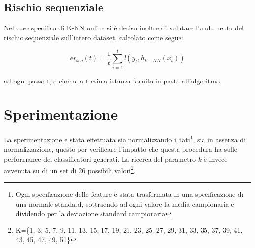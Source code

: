 \documentclass[fleqn,10pt]{SelfArx} %
\begin{document}
\subsection{Rischio sequenziale}
Nel caso specifico di K-NN online si è deciso inoltre di valutare l'andamento del rischio sequenziale sull'intero dataset, calcolato come segue:

\[
er_{seq}(t)=\frac{1}{t}\sum_{i=1}^{t} l(y_t,h_{k-NN}(x_t))
\]

ad ogni passo t, e cioè alla t-esima istanza fornita in pasto all'algoritmo.
\section{Sperimentazione}
La sperimentazione è stata effettuata sia normalizzando i dati\footnote{\footnotesize{Ogni specificazione delle feature è stata trasformata in una specificazione di una normale standard, sottraendo ad ogni valore la media campionaria e dividendo per la deviazione standard campionaria}}, sia in assenza di normalizzazione, questo per verificare l'impatto che questa procedura ha sulle performance dei classificatori generati.
\newline
\newline
La ricerca del parametro $k$ è invece avvenuta su di un set di 26 possibili valori\footnote{\footnotesize{K=\{1, 3, 5, 7, 9, 11, 13, 15, 17, 19, 21, 23, 25, 27, 29, 31, 33, 35, 37, 39, 41, 43, 45, 47, 49, 51\}}}.
\end{document}

